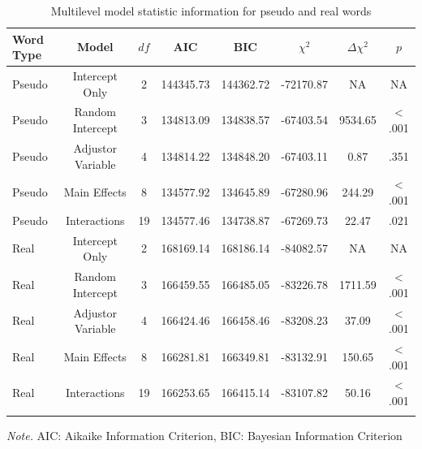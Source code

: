 \documentclass[
  english,
  man]{apa7}
\begin{document}
\begin{table}[tbp]

\begin{center}
\begin{threeparttable}

\caption{\label{tab:model-table1}Multilevel model statistic information for pseudo and real words}

\begin{tabular}{lccccccc}
\toprule
Word Type & Model & $df$ & AIC & BIC & $\chi^2$ & $\Delta\chi^2$ & $p$\\
\midrule
Pseudo & Intercept Only & 2 & 144345.73 & 144362.72 & -72170.87 & NA & NA\\
Pseudo & Random Intercept & 3 & 134813.09 & 134838.57 & -67403.54 & 9534.65 & < .001\\
Pseudo & Adjustor Variable & 4 & 134814.22 & 134848.20 & -67403.11 & 0.87 & .351\\
Pseudo & Main Effects & 8 & 134577.92 & 134645.89 & -67280.96 & 244.29 & < .001\\
Pseudo & Interactions & 19 & 134577.46 & 134738.87 & -67269.73 & 22.47 & .021\\
Real & Intercept Only & 2 & 168169.14 & 168186.14 & -84082.57 & NA & NA\\
Real & Random Intercept & 3 & 166459.55 & 166485.05 & -83226.78 & 1711.59 & < .001\\
Real & Adjustor Variable & 4 & 166424.46 & 166458.46 & -83208.23 & 37.09 & < .001\\
Real & Main Effects & 8 & 166281.81 & 166349.81 & -83132.91 & 150.65 & < .001\\
Real & Interactions & 19 & 166253.65 & 166415.14 & -83107.82 & 50.16 & < .001\\
\bottomrule
\addlinespace
\end{tabular}

\begin{tablenotes}[para]
\normalsize{\textit{Note.} AIC: Aikaike Information Criterion, BIC: Bayesian Information Criterion}
\end{tablenotes}

\end{threeparttable}
\end{center}

\end{table}
\end{document}
